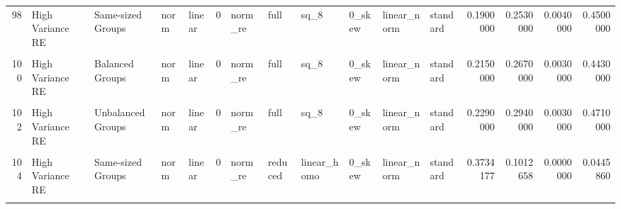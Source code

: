 \documentclass[12pt]{article}
\begin{document}
\begin{table}
{\begin{tabular}[t]{rllllrllllllrrrr}
98 & High Variance RE & Same-sized Groups & norm & linear & 0 & norm\_re & full & sq\_8 & 0\_skew & linear\_norm & standard & 0.1900000 & 0.2530000 & 0.0040000 & 0.4500000\\
\cellcolor{gray!6}{99} & \cellcolor{gray!6}{High Variance Error} & \cellcolor{gray!6}{Balanced Groups} & \cellcolor{gray!6}{norm} & \cellcolor{gray!6}{linear} & \cellcolor{gray!6}{0} & \cellcolor{gray!6}{norm\_re} & \cellcolor{gray!6}{full} & \cellcolor{gray!6}{sq\_8} & \cellcolor{gray!6}{0\_skew} & \cellcolor{gray!6}{linear\_norm} & \cellcolor{gray!6}{standard} & \cellcolor{gray!6}{0.0550000} & \cellcolor{gray!6}{0.4800000} & \cellcolor{gray!6}{0.4880000} & \cellcolor{gray!6}{0.3190000}\\
100 & High Variance RE & Balanced Groups & norm & linear & 0 & norm\_re & full & sq\_8 & 0\_skew & linear\_norm & standard & 0.2150000 & 0.2670000 & 0.0030000 & 0.4430000\\
\addlinespace
\cellcolor{gray!6}{101} & \cellcolor{gray!6}{High Variance Error} & \cellcolor{gray!6}{Unbalanced Groups} & \cellcolor{gray!6}{norm} & \cellcolor{gray!6}{linear} & \cellcolor{gray!6}{0} & \cellcolor{gray!6}{norm\_re} & \cellcolor{gray!6}{full} & \cellcolor{gray!6}{sq\_8} & \cellcolor{gray!6}{0\_skew} & \cellcolor{gray!6}{linear\_norm} & \cellcolor{gray!6}{standard} & \cellcolor{gray!6}{0.0640000} & \cellcolor{gray!6}{0.5000000} & \cellcolor{gray!6}{0.4630000} & \cellcolor{gray!6}{0.3220000}\\
102 & High Variance RE & Unbalanced Groups & norm & linear & 0 & norm\_re & full & sq\_8 & 0\_skew & linear\_norm & standard & 0.2290000 & 0.2940000 & 0.0030000 & 0.4710000\\
\cellcolor{gray!6}{103} & \cellcolor{gray!6}{High Variance Error} & \cellcolor{gray!6}{Same-sized Groups} & \cellcolor{gray!6}{norm} & \cellcolor{gray!6}{linear} & \cellcolor{gray!6}{0} & \cellcolor{gray!6}{norm\_re} & \cellcolor{gray!6}{reduced} & \cellcolor{gray!6}{linear\_homo} & \cellcolor{gray!6}{0\_skew} & \cellcolor{gray!6}{linear\_norm} & \cellcolor{gray!6}{standard} & \cellcolor{gray!6}{0.0445860} & \cellcolor{gray!6}{0.1019108} & \cellcolor{gray!6}{0.0700637} & \cellcolor{gray!6}{0.0445860}\\
104 & High Variance RE & Same-sized Groups & norm & linear & 0 & norm\_re & reduced & linear\_homo & 0\_skew & linear\_norm & standard & 0.3734177 & 0.1012658 & 0.0000000 & 0.0445860\\
\cellcolor{gray!6}{105} & \cellcolor{gray!6}{High Variance Error} & \cellcolor{gray!6}{Balanced Groups} & \cellcolor{gray!6}{norm} & \cellcolor{gray!6}{linear} & \cellcolor{gray!6}{0} & \cellcolor{gray!6}{norm\_re} & \cellcolor{gray!6}{reduced} & \cellcolor{gray!6}{linear\_homo} & \cellcolor{gray!6}{0\_skew} & \cellcolor{gray!6}{linear\_norm} & \cellcolor{gray!6}{standard} & \cellcolor{gray!6}{0.0691824} & \cellcolor{gray!6}{0.0880503} & \cellcolor{gray!6}{0.0880503} & \cellcolor{gray!6}{0.0503145}\\

\end{tabular}}
\end{table}
\end{document}
